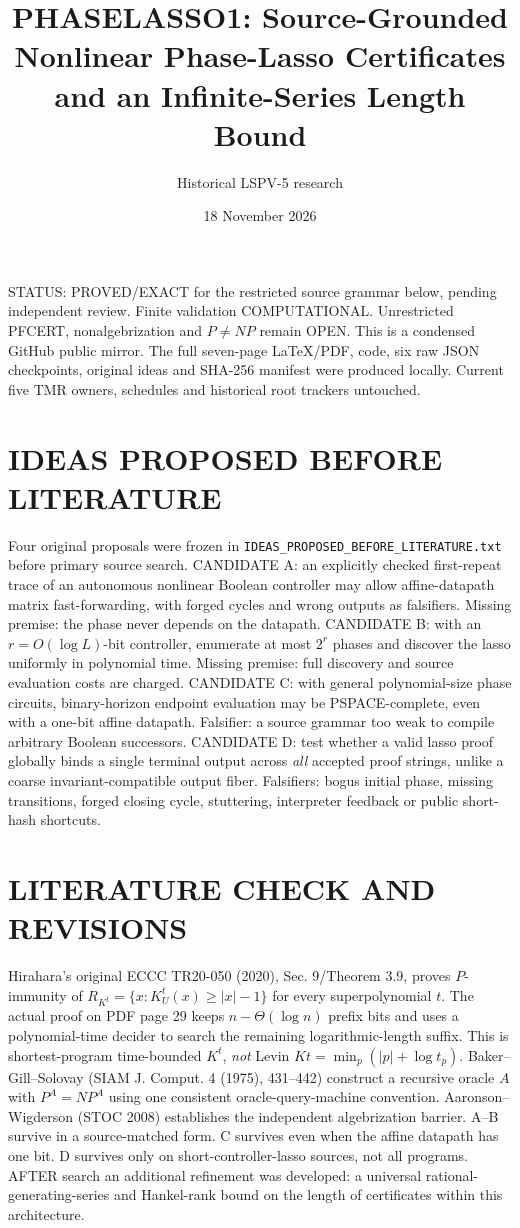 \documentclass[11pt]{article}
\title{PHASELASSO1: Source-Grounded Nonlinear Phase-Lasso Certificates and an Infinite-Series Length Bound}
\author{Historical LSPV-5 research}
\date{18 November 2026}
\begin{document}
\maketitle
\noindent STATUS: PROVED/EXACT for the restricted source grammar below, pending independent review. Finite validation COMPUTATIONAL. Unrestricted PFCERT, nonalgebrization and $P\ne NP$ remain OPEN. This is a condensed GitHub public mirror. The full seven-page LaTeX/PDF, code, six raw JSON checkpoints, original ideas and SHA-256 manifest were produced locally. Current five TMR owners, schedules and historical root trackers untouched.

\section{IDEAS PROPOSED BEFORE LITERATURE}
Four original proposals were frozen in \texttt{IDEAS\_PROPOSED\_BEFORE\_LITERATURE.txt} before primary source search. CANDIDATE A: an explicitly checked first-repeat trace of an autonomous nonlinear Boolean controller may allow affine-datapath matrix fast-forwarding, with forged cycles and wrong outputs as falsifiers. Missing premise: the phase never depends on the datapath. CANDIDATE B: with an $r=O(\log L)$-bit controller, enumerate at most $2^r$ phases and discover the lasso uniformly in polynomial time. Missing premise: full discovery and source evaluation costs are charged. CANDIDATE C: with general polynomial-size phase circuits, binary-horizon endpoint evaluation may be PSPACE-complete, even with a one-bit affine datapath. Falsifier: a source grammar too weak to compile arbitrary Boolean successors. CANDIDATE D: test whether a valid lasso proof globally binds a single terminal output across \emph{all} accepted proof strings, unlike a coarse invariant-compatible output fiber. Falsifiers: bogus initial phase, missing transitions, forged closing cycle, stuttering, interpreter feedback or public short-hash shortcuts.

\section{LITERATURE CHECK AND REVISIONS}
Hirahara's original ECCC TR20-050 (2020), Sec. 9/Theorem 3.9, proves $P$-immunity of $R_{K^t}=\{x:K_U^t(x)\ge |x|-1\}$ for every superpolynomial $t$. The actual proof on PDF page 29 keeps $n-\Theta(\log n)$ prefix bits and uses a polynomial-time decider to search the remaining logarithmic-length suffix. This is shortest-program time-bounded $K^t$, \emph{not} Levin $Kt=\min_p(|p|+\log t_p)$. Baker--Gill--Solovay (SIAM J. Comput. 4 (1975), 431--442) construct a recursive oracle $A$ with $P^A=NP^A$ using one consistent oracle-query-machine convention. Aaronson--Wigderson (STOC 2008) establishes the independent algebrization barrier. A--B survive in a source-matched form. C survives even when the affine datapath has one bit. D survives only on short-controller-lasso sources, not all programs. AFTER search an additional refinement was developed: a universal rational-generating-series and Hankel-rank bound on the length of certificates within this architecture.
\end{document}
